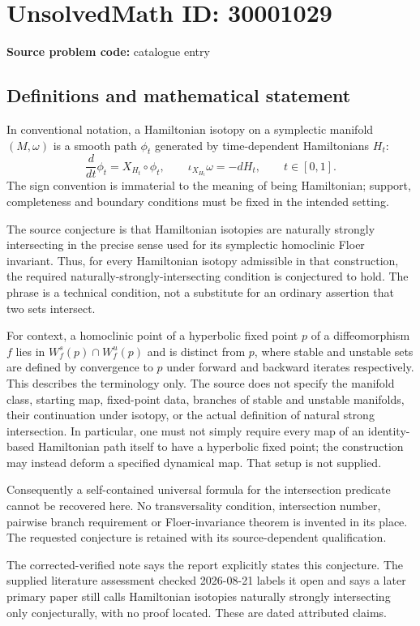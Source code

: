 \documentclass[11pt]{article}
\begin{document}
\section*{UnsolvedMath ID: 30001029}
\textbf{Source problem code:} catalogue entry
\subsection{Definitions and mathematical statement}
In conventional notation, a Hamiltonian isotopy on a symplectic manifold $(M,\omega)$ is a smooth path $\phi_t$ generated by time-dependent Hamiltonians $H_t$:
\[
\frac{d}{dt}\phi_t=X_{H_t}\circ\phi_t,
\qquad \iota_{X_{H_t}}\omega=-dH_t,
\qquad t\in[0,1].
\]
The sign convention is immaterial to the meaning of being Hamiltonian; support, completeness and boundary conditions must be fixed in the intended setting.

The source conjecture is that Hamiltonian isotopies are naturally strongly intersecting in the precise sense used for its symplectic homoclinic Floer invariant. Thus, for every Hamiltonian isotopy admissible in that construction, the required naturally-strongly-intersecting condition is conjectured to hold. The phrase is a technical condition, not a substitute for an ordinary assertion that two sets intersect.

For context, a homoclinic point of a hyperbolic fixed point $p$ of a diffeomorphism $f$ lies in $W^s_f(p)\cap W^u_f(p)$ and is distinct from $p$, where stable and unstable sets are defined by convergence to $p$ under forward and backward iterates respectively. This describes the terminology only. The source does not specify the manifold class, starting map, fixed-point data, branches of stable and unstable manifolds, their continuation under isotopy, or the actual definition of natural strong intersection. In particular, one must not simply require every map of an identity-based Hamiltonian path itself to have a hyperbolic fixed point; the construction may instead deform a specified dynamical map. That setup is not supplied.

Consequently a self-contained universal formula for the intersection predicate cannot be recovered here. No transversality condition, intersection number, pairwise branch requirement or Floer-invariance theorem is invented in its place. The requested conjecture is retained with its source-dependent qualification.

The corrected-verified note says the report explicitly states this conjecture. The supplied literature assessment checked 2026-08-21 labels it open and says a later primary paper still calls Hamiltonian isotopies naturally strongly intersecting only conjecturally, with no proof located. These are dated attributed claims.
\end{document}
